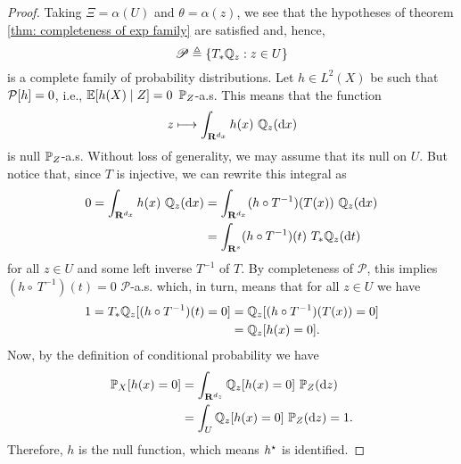 \begin{proof}
    Taking $ \Xi = \alpha ( U ) $ and $ \theta = \alpha ( z ) $, we see that the hypotheses of theorem \ref{thm: completeness of exp family} are satisfied and, hence,
    \begin{equation*}
        \mathscr{P} \triangleq \left\{ T_{ * }\mathbb{Q}_{ z } : z \in U \right\}
    \end{equation*}
    is a complete family of probability distributions.
    Let $ h \in L^2 ( X ) $ be such that $ \mathcal{P} [ h ] = 0 $, i.e., $ \mathbb{E} [ h ( X ) \mid Z ] = 0 $ $ \mathbb{P}_{ Z } $-a.s.
    This means that the function
    \begin{equation*}
        z \longmapsto \int_{ \mathbf{R}^{ d_{ x } } } h ( x ) \ \mathbb{Q}_{ z } ( \mathrm{d} x )
    \end{equation*}
    is null $ \mathbb{P}_{ Z } $-a.s.
    Without loss of generality, we may assume that its null on $ U $.
    But notice that, since $ T $ is injective, we can rewrite this integral as
    \begin{align*}
        0 = \int_{ \mathbf{R}^{ d_{ x } } } h ( x ) \ \mathbb{Q}_{ z } ( \mathrm{d} x )
        &= \int_{ \mathbf{R}^{ d_{ x } } } ( h \circ T^{ -1 } ) ( T ( x ) ) \ \mathbb{Q}_{ z } ( \mathrm{d} x ) \\
        &= \int_{ \mathbf{R}^{ s } } ( h \circ T^{ -1 } ) ( t ) \ T_{ * }\mathbb{Q}_{ z } ( \mathrm{d} t )
    \end{align*}
    for all $ z \in U $ and some left inverse $ T^{ -1 } $ of $ T $.
    By completeness of $ \mathscr{P} $, this implies $ (h \circ~T^{ -1 }) ( t ) = 0 $ $ \mathscr{P} $-a.s. which, in turn, means that for all $ z \in U $ we have
    \begin{align*}
        1 = T_{ * } \mathbb{Q}_{ z } [ ( h \circ T^{ -1 } ) ( t ) = 0 ]
        &= \mathbb{Q}_{ z } [ ( h \circ T^{ -1 } ) ( T ( x ) ) = 0 ] \\
        &= \mathbb{Q}_{ z } [ h ( x ) = 0 ]
    .\end{align*}
    Now, by the definition of conditional probability we have
    \begin{align*}
        \prob_{ X } [ h ( x ) = 0 ]
        &= \int_{ \R^{ d_{ z } } } \probq_{ z } [ h ( x ) = 0 ] \ \prob_{ Z } ( \ddrm z ) \\
        &= \int_{ U } \probq_{ z } [ h ( x ) = 0 ] \ \prob_{ Z } ( \ddrm z )
        = 1
    .\end{align*}
    Therefore, $ h $ is the null function, which means $ h^{ \star } $ is identified.
\end{proof}

